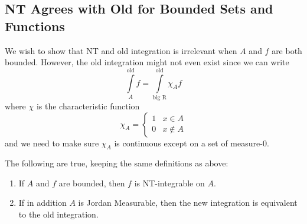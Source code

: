 \documentclass{article}
\numberwithin{equation}{section}
\begin{document}
\subsection{NT Agrees with Old for Bounded Sets and Functions}
We wish to show that NT and old integration is irrelevant when $A$ and $f$ are both bounded. However, the old integration might not even exist since we can write
\begin{equation}
    \int\limits_A^{\text{old}} f = \int\limits_{\text{big R}}^{\text{old}} \chi_A f
\end{equation} 
where $\chi$ is the characteristic function
\begin{equation}
    \chi_A = \begin{cases}
        1 & x\in A \\ 
        0 & x\notin A
    \end{cases}
\end{equation}
and we need to make sure $\chi_A$ is continuous except on a set of measure-$0$.
\begin{theorem}
    The following are true, keeping the same definitions as above:
    \begin{enumerate}
        \item If $A$ and $f$ are bounded, then $f$ is NT-integrable on $A$.
        \item If in addition $A$ is Jordan Measurable, then
        the new integration is equivalent to the old integration.
    \end{enumerate}
\end{theorem}
\end{document}
